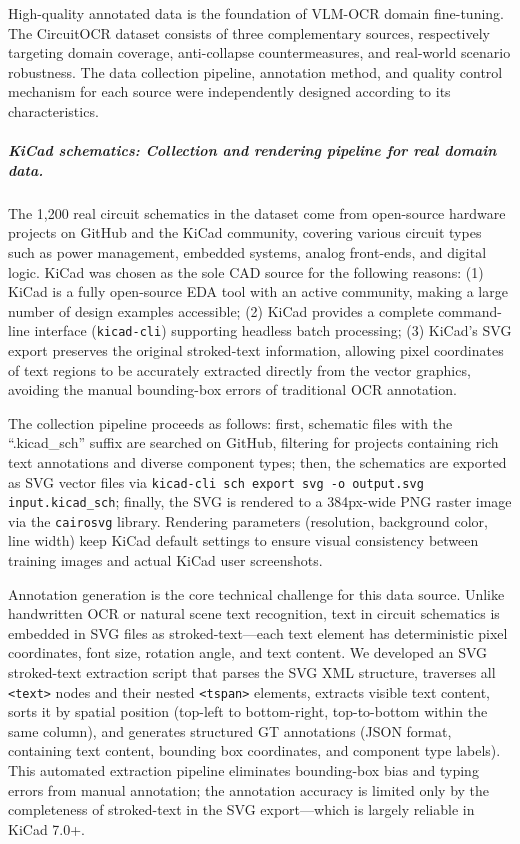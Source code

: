 High-quality annotated data is the foundation of VLM-OCR domain fine-tuning. The CircuitOCR dataset consists of three complementary sources, respectively targeting domain coverage, anti-collapse countermeasures, and real-world scenario robustness. The data collection pipeline, annotation method, and quality control mechanism for each source were independently designed according to its characteristics.

\subparagraph{KiCad schematics: Collection and rendering pipeline for real domain data.}
The 1,200 real circuit schematics in the dataset come from open-source hardware projects on GitHub and the KiCad community, covering various circuit types such as power management, embedded systems, analog front-ends, and digital logic. KiCad was chosen as the sole CAD source for the following reasons: (1) KiCad is a fully open-source EDA tool with an active community, making a large number of design examples accessible; (2) KiCad provides a complete command-line interface (\texttt{kicad-cli}) supporting headless batch processing; (3) KiCad's SVG export preserves the original stroked-text information, allowing pixel coordinates of text regions to be accurately extracted directly from the vector graphics, avoiding the manual bounding-box errors of traditional OCR annotation.

The collection pipeline proceeds as follows: first, schematic files with the ``.kicad\_sch'' suffix are searched on GitHub, filtering for projects containing rich text annotations and diverse component types; then, the schematics are exported as SVG vector files via \texttt{kicad-cli sch export svg -o output.svg input.kicad\_sch}; finally, the SVG is rendered to a 384px-wide PNG raster image via the \texttt{cairosvg} library. Rendering parameters (resolution, background color, line width) keep KiCad default settings to ensure visual consistency between training images and actual KiCad user screenshots.

Annotation generation is the core technical challenge for this data source. Unlike handwritten OCR or natural scene text recognition, text in circuit schematics is embedded in SVG files as stroked-text---each text element has deterministic pixel coordinates, font size, rotation angle, and text content. We developed an SVG stroked-text extraction script that parses the SVG XML structure, traverses all \texttt{<text>} nodes and their nested \texttt{<tspan>} elements, extracts visible text content, sorts it by spatial position (top-left to bottom-right, top-to-bottom within the same column), and generates structured GT annotations (JSON format, containing text content, bounding box coordinates, and component type labels). This automated extraction pipeline eliminates bounding-box bias and typing errors from manual annotation; the annotation accuracy is limited only by the completeness of stroked-text in the SVG export---which is largely reliable in KiCad 7.0+.


